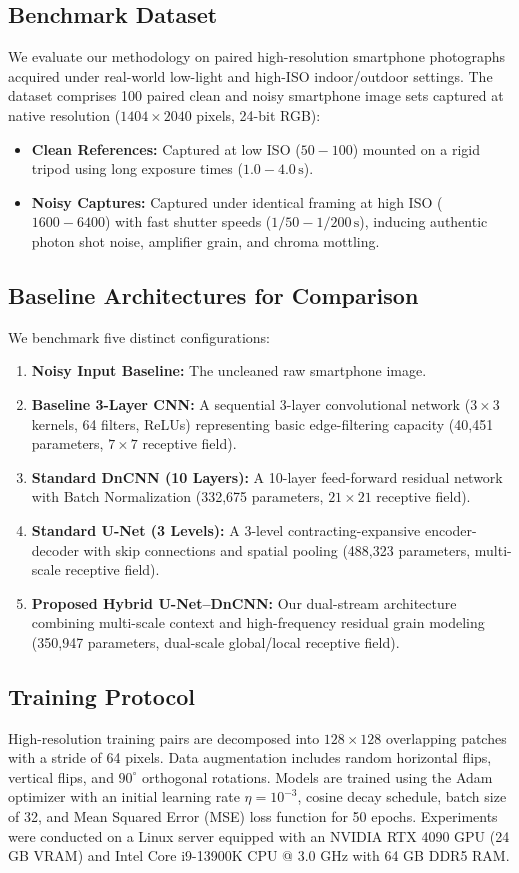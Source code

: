 \documentclass{ieeeaccess}
\begin{document}
\subsection{Benchmark Dataset}
We evaluate our methodology on paired high-resolution smartphone photographs acquired under real-world low-light and high-ISO indoor/outdoor settings. The dataset comprises 100 paired clean and noisy smartphone image sets captured at native resolution ($1404 \times 2040$ pixels, 24-bit RGB):
\begin{itemize}
    \item \textbf{Clean References:} Captured at low ISO ($50 - 100$) mounted on a rigid tripod using long exposure times ($1.0 - 4.0\,\text{s}$).
    \item \textbf{Noisy Captures:} Captured under identical framing at high ISO ($1600 - 6400$) with fast shutter speeds ($1/50 - 1/200\,\text{s}$), inducing authentic photon shot noise, amplifier grain, and chroma mottling.
\end{itemize}

\subsection{Baseline Architectures for Comparison}
We benchmark five distinct configurations:
\begin{enumerate}
    \item \textbf{Noisy Input Baseline:} The uncleaned raw smartphone image.
    \item \textbf{Baseline 3-Layer CNN:} A sequential 3-layer convolutional network ($3 \times 3$ kernels, 64 filters, ReLUs) representing basic edge-filtering capacity (40,451 parameters, $7 \times 7$ receptive field).
    \item \textbf{Standard DnCNN (10 Layers):} A 10-layer feed-forward residual network with Batch Normalization (332,675 parameters, $21 \times 21$ receptive field).
    \item \textbf{Standard U-Net (3 Levels):} A 3-level contracting-expansive encoder-decoder with skip connections and spatial pooling (488,323 parameters, multi-scale receptive field).
    \item \textbf{Proposed Hybrid U-Net--DnCNN:} Our dual-stream architecture combining multi-scale context and high-frequency residual grain modeling (350,947 parameters, dual-scale global/local receptive field).
\end{enumerate}

\subsection{Training Protocol}
High-resolution training pairs are decomposed into $128 \times 128$ overlapping patches with a stride of 64 pixels. Data augmentation includes random horizontal flips, vertical flips, and $90^\circ$ orthogonal rotations. Models are trained using the Adam optimizer with an initial learning rate $\eta = 10^{-3}$, cosine decay schedule, batch size of 32, and Mean Squared Error (MSE) loss function for 50 epochs. Experiments were conducted on a Linux server equipped with an NVIDIA RTX 4090 GPU (24 GB VRAM) and Intel Core i9-13900K CPU @ 3.0 GHz with 64 GB DDR5 RAM.
\end{document}
